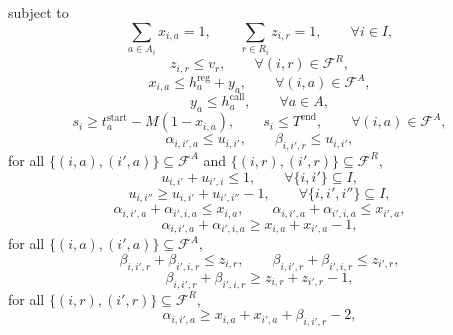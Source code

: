 \documentclass[11pt,a4paper]{article}
\begin{document}
subject to
\begin{equation}
\sum_{a \in A_i} x_{i,a} = 1,
\qquad
\sum_{r \in R_i} z_{i,r} = 1,
\qquad \forall i \in I,
\tag{M2}
\end{equation}
\begin{equation}
z_{i,r} \le v_r,
\qquad \forall (i,r) \in \mathcal{F}^R,
\tag{M3}
\end{equation}
\begin{equation}
x_{i,a} \le h_a^{\mathrm{reg}} + y_a,
\qquad \forall (i,a) \in \mathcal{F}^A,
\tag{M4}
\end{equation}
\begin{equation}
y_a \le h_a^{\mathrm{call}},
\qquad \forall a \in A,
\tag{M5}
\end{equation}
\begin{equation}
s_i \ge t_a^{\mathrm{start}} - M(1-x_{i,a}),
\qquad
s_i \le T^{\mathrm{end}},
\qquad \forall (i,a) \in \mathcal{F}^A,
\tag{M6}
\end{equation}
\begin{equation}
\alpha_{i,i',a} \le u_{i,i'},
\qquad
\beta_{i,i',r} \le u_{i,i'},
\tag{M7}
\end{equation}
for all $\{(i,a),(i',a)\}\subseteq \mathcal{F}^A$ and
$\{(i,r),(i',r)\}\subseteq \mathcal{F}^R$,
\begin{equation}
u_{i,i'} + u_{i',i} \le 1,
\qquad \forall \{i,i'\} \subseteq I,
\tag{M8}
\end{equation}
\begin{equation}
u_{i,i''} \ge u_{i,i'} + u_{i',i''} - 1,
\qquad \forall \{i,i',i''\} \subseteq I,
\tag{M9}
\end{equation}
\begin{equation}
\alpha_{i,i',a} + \alpha_{i',i,a} \le x_{i,a},
\qquad
\alpha_{i,i',a} + \alpha_{i',i,a} \le x_{i',a},
\tag{M10}
\end{equation}
\begin{equation}
\alpha_{i,i',a} + \alpha_{i',i,a} \ge x_{i,a} + x_{i',a} - 1,
\tag{M11}
\end{equation}
for all $\{(i,a),(i',a)\}\subseteq \mathcal{F}^A$,
\begin{equation}
\beta_{i,i',r} + \beta_{i',i,r} \le z_{i,r},
\qquad
\beta_{i,i',r} + \beta_{i',i,r} \le z_{i',r},
\tag{M12}
\end{equation}
\begin{equation}
\beta_{i,i',r} + \beta_{i',i,r} \ge z_{i,r} + z_{i',r} - 1,
\tag{M13}
\end{equation}
for all $\{(i,r),(i',r)\}\subseteq \mathcal{F}^R$,
\begin{equation}
\alpha_{i,i',a} \ge x_{i,a} + x_{i',a} + \beta_{i,i',r} - 2,
\tag{M14}
\end{equation}
\end{document}
